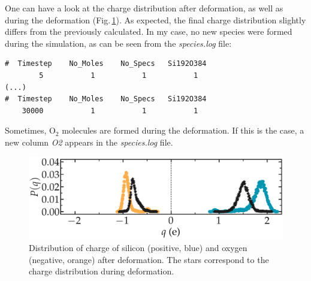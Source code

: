 \documentclass[9pt,tutorial]{livecoms}
\begin{document}
One can have a look at the charge distribution after deformation, as well as during the deformation (Fig.\,\ref{fig:SIO-distribution-bis}). As expected, the final charge distribution slightly differs from the previously calculated. In my case, no new species were formed during the simulation, as can be seen from the \textit{species.log} file:
{\normalsize \begin{verbatim}
#  Timestep    No_Moles    No_Specs   Si192O384
        5           1           1           1
(...)
#  Timestep    No_Moles    No_Specs   Si192O384
    30000           1           1           1
\end{verbatim}}
Sometimes, $\text{O}_2$ molecules are formed during the deformation. If this is the case, a new column \textit{O2} appears in the \textit{species.log} file.

\begin{figure}
\includegraphics[width=\linewidth]{SIO-distribution-bis}
\caption{Distribution of charge of silicon (positive, blue) and oxygen (negative, orange) after deformation. The stars correspond to the charge distribution during deformation.}
\label{fig:SIO-distribution-bis}
\end{figure}
\end{document}
